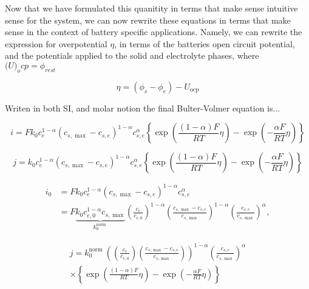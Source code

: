 \documentclass[lettersize,journal]{IEEEtran}
\begin{document}
\noindent Now that we have formulated this quanitity in terms that make sense intuitive sense for the system, we can now rewrite these equations in terms that make sense in the context of battery specific applications. Namely, we can rewrite the expression for overpotential $\eta$, in terms of the batteries open circuit potential, and the potentials applied to the solid and electrolyte phases, where $\mathscr(U)_ocp = \phi_{rest}$

\begin{equation}
\eta=\left(\phi_{s}-\phi_{e}\right)-U_{\mathrm{ocp}}
\end{equation}

Writen in both SI, and molar notion the final Bulter-Volmer equation is...


\begin{equation}
i=F k_{0} c_{e}^{1-\alpha}\left(c_{s, \max }-c_{s, e}\right)^{1-\alpha} c_{s, e}^{\alpha}\left\{\exp \left(\frac{(1-\alpha) F}{R T} \eta\right)-\exp \left(-\frac{\alpha F}{R T} \eta\right)\right\}
\end{equation}

\begin{equation}
j=k_{0} c_{e}^{1-\alpha}\left(c_{s, \max }-c_{s, e}\right)^{1-\alpha} c_{s, e}^{\alpha}\left\{\exp \left(\frac{(1-\alpha) F}{R T} \eta\right)-\exp \left(-\frac{\alpha F}{R T} \eta\right)\right\}
\end{equation}


\begin{equation}
\begin{aligned}
i_{0} &=F k_{0} c_{e}^{1-\alpha}\left(c_{s, \max }-c_{s, e}\right)^{1-\alpha} c_{s, e}^{\alpha} \\
&=F \underbrace{k_{0} c_{e, 0}^{1-\alpha} c_{s, \max }}_{k_{0}^{\text {norm }}}\left(\frac{c_{e}}{c_{e, 0}}\right)^{1-\alpha}\left(\frac{c_{s, \max }-c_{s, e}}{c_{s, \max }}\right)^{1-\alpha}\left(\frac{c_{s, e}}{c_{s, \max }}\right)^{\alpha},
\end{aligned}
\end{equation}

\begin{equation}
\begin{array}{c}
j=k_{0}^{\text {norm }}\left(\left(\frac{c_{e}}{c_{e, 0}}\right)\left(\frac{c_{s, \max }-c_{s, e}}{c_{s, \max }}\right)\right)^{1-\alpha}\left(\frac{c_{s, e}}{c_{s, \max }}\right)^{\alpha} \\
\times\left\{\exp \left(\frac{(1-\alpha) F}{R T} \eta\right)-\exp \left(-\frac{\alpha F}{R T} \eta\right)\right\}
\end{array}
\end{equation}
\end{document}

